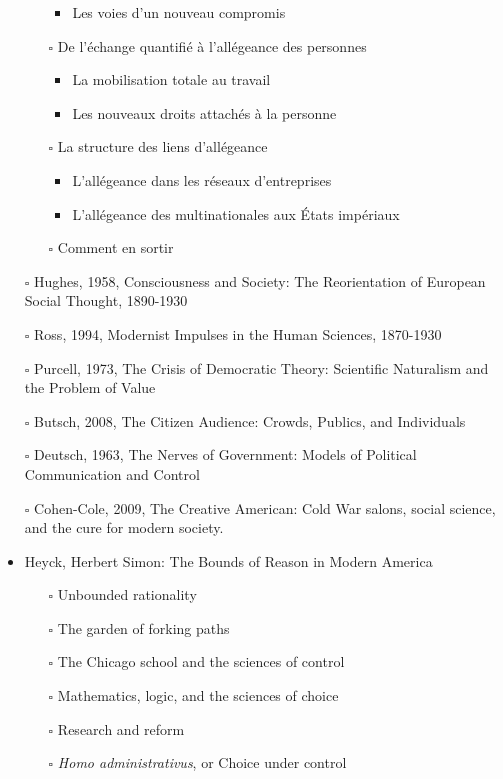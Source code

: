 \documentclass[paper=B6,portrait,twoside=true,twocolumn=false,headinclude=true,footinclude=false,fontsize=12,BCOR=10mm,DIV=calc,pagesize=auto,titlepage=firstiscover,mpinclude=false,headings=normal,headings=twolinechapter,open=right,toc=graduated,chapterprefix=false,numbers=endperiod,parskip=half+]{scrbook}
\theoremstyle{definition}
\begin{document}
\begin{itemize}
\begin{itemize}
\begin{itemize}
\item Les voies d'un nouveau compromis
\end{itemize}
\item[{$\square$}] De l'échange quantifié à l’allégeance des personnes
\begin{itemize}
\item La mobilisation totale au travail
\item Les nouveaux droits attachés à la personne
\end{itemize}
\item[{$\square$}] La structure des liens d’allégeance
\begin{itemize}
\item L'allégeance dans les réseaux d'entreprises
\item L'allégeance des multinationales aux États impériaux
\end{itemize}
\item[{$\square$}] Comment en sortir
\end{itemize}
\item[{$\square$}] Hughes, 1958, Consciousness and Society: The Reorientation of European Social Thought, 1890-1930
\item[{$\square$}] Ross, 1994, Modernist Impulses in the Human Sciences, 1870-1930
\item[{$\square$}] Purcell, 1973, The Crisis of Democratic Theory: Scientific Naturalism and the Problem of Value
\item[{$\square$}] Butsch, 2008, The Citizen Audience: Crowds, Publics, and Individuals
\item[{$\square$}] Deutsch, 1963, The Nerves of Government: Models of Political Communication and Control
\item[{$\square$}] Cohen-Cole, 2009, The Creative American: Cold War salons, social science, and the cure for modern society.
\item\relax [0/15] Heyck, Herbert Simon: The Bounds of Reason in Modern America
\begin{itemize}
\item[{$\square$}] Unbounded rationality
\item[{$\square$}] The garden of forking paths
\item[{$\square$}] The Chicago school and the sciences of control
\item[{$\square$}] Mathematics, logic, and the sciences of choice
\item[{$\square$}] Research and reform
\item[{$\square$}] \emph{Homo administrativus}, or Choice under control

\end{itemize}
\end{itemize}
\end{document}
